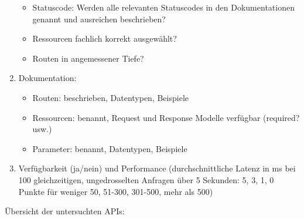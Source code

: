 \documentclass[notitlepage, hidelinks]{article}
\begin{document}
\begin{enumerate}
\begin{itemize}
\item Statuscode: Werden alle relevanten Statuscodes in den Dokumentationen genannt und ausreichen beschrieben?
\item Ressourcen fachlich korrekt ausgewählt?
\item Routen in angemessener Tiefe?
\end{itemize}
\item Dokumentation:
\begin{itemize}
\item Routen: beschrieben, Datentypen, Beispiele
\item Ressourcen: benannt, Request und Response Modelle verfügbar (required? usw.)
\item Parameter: benannt, Datentypen, Beispiele
\end{itemize}
\item Verfügbarkeit (ja/nein) und Performance (durchschnittliche Latenz in ms bei 100 gleichzeitigen, ungedrosselten Anfragen über 5 Sekunden: 5, 3, 1, 0 Punkte für weniger 50, 51-300, 301-500,  mehr als 500)
\end{enumerate}

Übersicht der untersuchten APIs:
\end{document}
